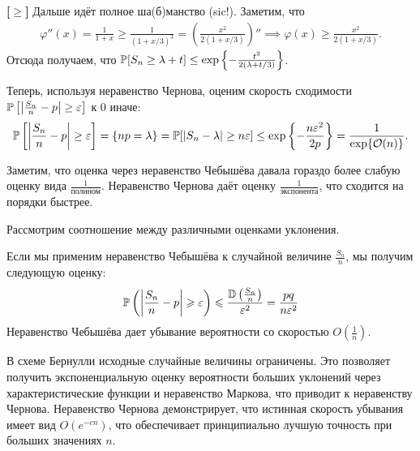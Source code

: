 \begin{proofbox}
    \textbf{[$\ge$]} Дальше идёт полное ша(б)манство (sic!). Заметим, что
    \begin{align*}
        \varphi''(x) = \frac{1}{1 + x} \ge \frac{1}{(1 + x/3)^3} = \left( \frac{x^2}{2(1 + x/3)} \right)'' \implies \varphi(x) \ge \frac{x^2}{2(1 + x/3)}.
    \end{align*}
    Отсюда получаем, что $\P[S_n \ge \lambda + t] \le \exp\left\{ -\frac{t^2}{2(\lambda + t/3)} \right\}$.
\end{proofbox}

Теперь, используя неравенство Чернова, оценим скорость сходимости $\P\left[\left| \frac{S_n}{n} - p \right| \ge \varepsilon\right]$ к 0 иначе:
\begin{align*}
    \P\left[ \left| \frac{S_n}{n} - p \right| \ge \varepsilon \right] = \{ np = \lambda \} = \P[|S_n - \lambda| \ge n\varepsilon] \le \exp\left\{ -\frac{n\varepsilon^2}{2p} \right\} = \frac{1}{\exp\{\mathcal{O}(n)\}}.
\end{align*}

Заметим, что оценка через неравенство Чебышёва давала гораздо более слабую оценку вида $\frac{1}{\text{полином}}$. Неравенство Чернова даёт оценку $\frac{1}{\text{экспонента}}$, что сходится на порядки быстрее.


\vspace{1em}
Рассмотрим соотношение между различными оценками уклонения.

\begin{remark}\label{comp:chernoff_cheb}
    Если мы применим неравенство Чебышёва к случайной величине $\frac{S_n}{n}$, мы получим следующую оценку:
    \begin{align*}
        \P\left( \left| \frac{S_n}{n} - p \right| \geqslant \varepsilon \right) \leqslant \frac{\D \left(\frac{S_n}{n}\right)}{\varepsilon^2} = \frac{pq}{n \varepsilon^2}
    \end{align*}
    Неравенство Чебышёва дает убывание вероятности со скоростью $O\left(\frac{1}{n}\right)$.
    
    В схеме Бернулли исходные случайные величины ограничены. Это позволяет получить экспоненциальную оценку вероятности больших уклонений через характеристические функции и неравенство Маркова, что приводит к неравенству Чернова. Неравенство Чернова демонстрирует, что истинная скорость убывания имеет вид $O(e^{-cn})$, что обеспечивает принципиально лучшую точность при больших значениях $n$.
\end{remark}

